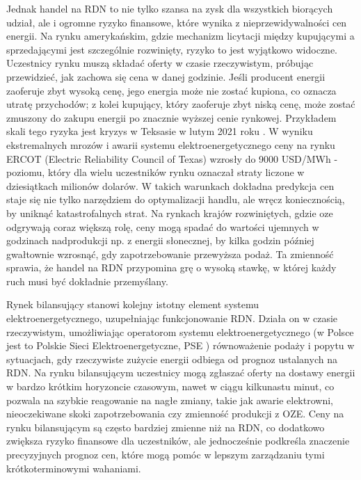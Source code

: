 Jednak handel na RDN to nie tylko szansa na zysk dla wszystkich biorących udział, ale i ogromne ryzyko finansowe, które wynika z nieprzewidywalności cen energii. Na rynku amerykańskim, gdzie mechanizm licytacji między kupującymi a sprzedającymi jest szczególnie rozwinięty, ryzyko to jest wyjątkowo widoczne. Uczestnicy rynku muszą składać oferty w czasie rzeczywistym, próbując przewidzieć, jak zachowa się cena w danej godzinie. Jeśli producent energii zaoferuje zbyt wysoką cenę, jego energia może nie zostać kupiona, co oznacza utratę przychodów; z kolei kupujący, który zaoferuje zbyt niską cenę, może zostać zmuszony do zakupu energii po znacznie wyższej cenie rynkowej. Przykładem skali tego ryzyka jest kryzys w Teksasie w lutym 2021 roku \cite{BUSBY2021102106}. W wyniku ekstremalnych mrozów i awarii systemu elektroenergetycznego ceny na rynku ERCOT (Electric Reliability Council of Texas) wzrosły do 9000 USD/MWh - poziomu, który dla wielu uczestników rynku oznaczał straty liczone w dziesiątkach milionów dolarów. W takich warunkach dokładna predykcja cen staje się nie tylko narzędziem do optymalizacji handlu, ale wręcz koniecznością, by uniknąć katastrofalnych strat. Na rynkach krajów rozwiniętych, gdzie \gls{oze} odgrywają coraz większą rolę, ceny mogą spadać do wartości ujemnych w godzinach nadprodukcji np. z energii słonecznej, by kilka godzin później gwałtownie wzrosnąć, gdy zapotrzebowanie przewyższa podaż. Ta zmienność sprawia, że handel na RDN przypomina grę o wysoką stawkę, w której każdy ruch musi być dokładnie przemyślany.

Rynek bilansujący stanowi kolejny istotny element systemu elektroenergetycznego, uzupełniając funkcjonowanie RDN. Działa on w czasie rzeczywistym, umożliwiając operatorom systemu elektroenergetycznego (w Polsce jest to Polskie Sieci Elektroenergetyczne, PSE \cite{PSE_BALANCING_MARKET}) równoważenie podaży i popytu w sytuacjach, gdy rzeczywiste zużycie energii odbiega od prognoz ustalanych na RDN. Na rynku bilansującym uczestnicy mogą zgłaszać oferty na dostawy energii w bardzo krótkim horyzoncie czasowym, nawet w ciągu kilkunastu minut, co pozwala na szybkie reagowanie na nagłe zmiany, takie jak awarie elektrowni, nieoczekiwane skoki zapotrzebowania czy zmienność produkcji z OZE. Ceny na rynku bilansującym są często bardziej zmienne niż na RDN, co dodatkowo zwiększa ryzyko finansowe dla uczestników, ale jednocześnie podkreśla znaczenie precyzyjnych prognoz cen, które mogą pomóc w lepszym zarządzaniu tymi krótkoterminowymi wahaniami.

